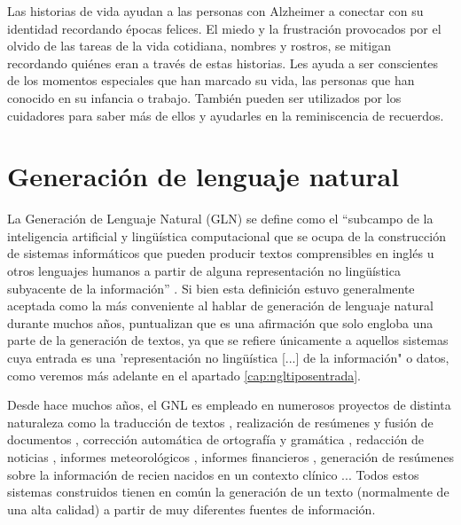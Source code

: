 Las historias de vida ayudan a las personas con Alzheimer a conectar con su identidad recordando épocas felices. El miedo y la frustración provocados por el olvido de las tareas de la vida cotidiana, nombres y rostros, se mitigan recordando quiénes eran a través de estas historias. Les ayuda a ser conscientes de los momentos especiales que han marcado su vida, las personas que han conocido en su infancia o trabajo. También pueden ser utilizados por los cuidadores para saber más de ellos y ayudarles en la reminiscencia de recuerdos. \citep{karlsson2014stories}



\section{Generación de lenguaje natural}

La Generación de Lenguaje Natural (GLN) se define como el ``subcampo de la inteligencia artificial y lingüística computacional que se ocupa de la construcción de sistemas informáticos que pueden producir textos comprensibles en inglés u otros lenguajes humanos a partir de alguna representación no lingüística subyacente de la información''  \citep{reiter1997building}. Si bien esta definición estuvo generalmente aceptada como la más conveniente al hablar de generación de lenguaje natural durante muchos años, \cite{gatt2018survey} puntualizan que es una afirmación que solo engloba una parte de la generación de textos, ya que se refiere únicamente a aquellos sistemas cuya entrada es una 'representación no lingüística [...] de la información" o datos, como veremos más adelante en el apartado \ref{cap:ngltiposentrada}.

Desde hace muchos años, el GNL es empleado en numerosos proyectos de distinta naturaleza como la traducción de textos \citep{Cho2014LearningPR}, realización de resúmenes y fusión de documentos \citep{clarke2010discourse}, corrección automática de ortografía y gramática \citep{Kukich1992TechniquesFA}, redacción de noticias \citep{molina2011generating}, informes meteorológicos \citep{goldberg1994using}, informes financieros \citep{Kukich1983DesignOA}, generación de resúmenes sobre la información de recien nacidos en un contexto clínico \citep{BabyTalk}... Todos estos sistemas construidos tienen en común la generación de un texto (normalmente de una alta calidad) a partir de muy diferentes fuentes de información. 

